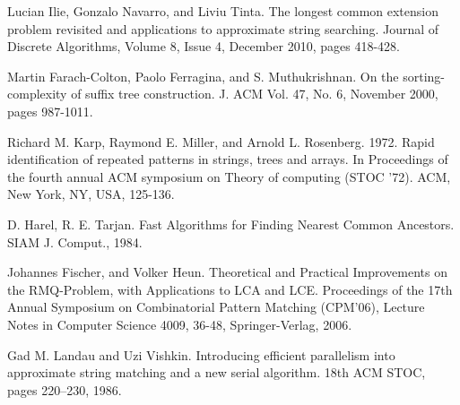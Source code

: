 \documentclass[a4]{article}
\begin{document}
\begin{thebibliography}{9}

 Lucian Ilie, Gonzalo Navarro, and Liviu Tinta. The longest common extension problem revisited and applications to approximate string searching. Journal of Discrete Algorithms, Volume 8, Issue 4, December 2010, pages 418-428.


 Martin Farach-Colton, Paolo Ferragina, and S. Muthukrishnan. On the sorting-complexity of suffix tree construction. J. ACM Vol. 47, No. 6, November 2000, pages 987-1011.

 Richard M. Karp, Raymond E. Miller, and Arnold L. Rosenberg. 1972. Rapid identification of repeated patterns in strings, trees and arrays. In Proceedings of the fourth annual ACM symposium on Theory of computing (STOC '72). ACM, New York, NY, USA, 125-136.

 D. Harel, R. E. Tarjan. Fast Algorithms for Finding Nearest Common Ancestors. SIAM J. Comput., 1984.

 Johannes Fischer, and Volker Heun. Theoretical and Practical Improvements on the RMQ-Problem, with Applications to LCA and LCE. Proceedings of the 17th Annual Symposium on Combinatorial Pattern Matching (CPM'06), Lecture Notes in Computer Science 4009, 36-48, Springer-Verlag, 2006.



 Gad M. Landau and Uzi Vishkin. Introducing efficient parallelism into approximate string matching and a new serial algorithm. 18th ACM STOC, pages 220–230, 1986.

\end{thebibliography}

\end{document}
